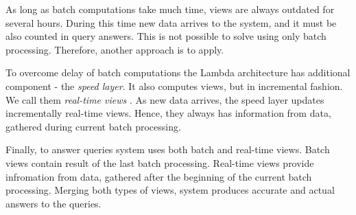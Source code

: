 As long as batch computations take much time, views are always outdated for several hours.
During this time new data arrives to the system, and it must be also counted in query answers.
This is not possible to solve using only batch processing.
Therefore, another approach is to apply.

To overcome delay of batch computations the Lambda architecture has additional component - the \textit{speed layer}.
It also computes views, but in incremental fashion.
We call them \textit{real-time views} .
As new data arrives, the speed layer updates incrementally real-time views.
Hence, they always has information from data, gathered during current batch processing.

Finally, to answer queries system uses both batch and real-time views.
Batch views contain result of the last batch processing.
Real-time views provide infromation from data, gathered after the beginning of the current batch processing.
Merging both types of views, system produces accurate and actual answers to the queries.